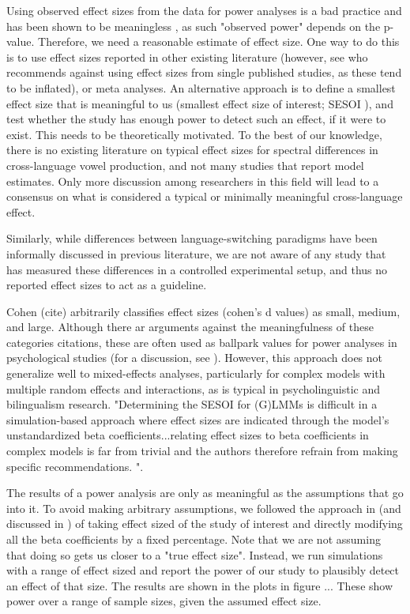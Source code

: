 \documentclass[12 pt]{article}
\begin{document}
Using observed effect sizes from the data for power analyses is a bad practice and has been shown to be meaningless \citep{hoenig2001abuse, gelman2019observed_effect_size}, as such "observed power" depends on the p-value. Therefore, we need a reasonable estimate of effect size. One way to do this is to use effect sizes reported in other existing literature (however, see \cite{brysbaert2018power} who recommends against using effect sizes from single published studies, as these tend to be inflated), or meta analyses. An alternative approach is to define a smallest effect size that is meaningful to us (smallest effect size of interest; SESOI \citep{kumle2021estimating}), and test whether the study has enough power to detect such an effect, if it were to exist. This needs to be theoretically motivated. To the best of our knowledge, there is no existing literature on typical effect sizes for spectral differences in cross-language vowel production, and not many studies that report model estimates. Only more discussion among researchers in this field will lead to a consensus on what is considered a typical or minimally meaningful cross-language effect. 

Similarly, while differences between language-switching paradigms have been informally discussed in previous literature, we are not aware of any study that has measured these differences in a controlled experimental setup, and thus no reported effect sizes to act as a guideline. 

Cohen (cite) arbitrarily classifies effect sizes (cohen's d values) as small, medium, and large. Although there ar arguments against the meaningfulness of these categories \alert{citations}, these are often used as ballpark values for power analyses in psychological studies (for a discussion, see \cite{brysbaert2018power}). However, this approach does not generalize well to mixed-effects analyses, particularly for complex models with multiple random effects and interactions, as is typical in psycholinguistic and bilingualism research. "Determining the SESOI for (G)LMMs is difficult in a simulation-based approach where effect sizes are indicated through the model’s unstandardized beta coefficients...relating effect sizes to beta coefficients in complex models is far from trivial and the authors therefore refrain from making specific recommendations. \citep{kumle2021estimating}". 

The results of a power analysis are only as meaningful as the assumptions that go into it. To avoid making arbitrary assumptions, we followed the approach in \cite{brysbaert2018power} (and discussed in \cite{kumle2021estimating}) of taking effect sized of the study of interest and directly modifying all the beta coefficients by a fixed percentage. Note that we are not assuming that doing so gets us closer to a "true effect size". Instead, we run simulations with a range of effect sized and report the power of our study to plausibly detect an effect of that size. The results are shown in the plots in figure ... These show power over a range of sample sizes, given the assumed effect size.   
\end{document}
